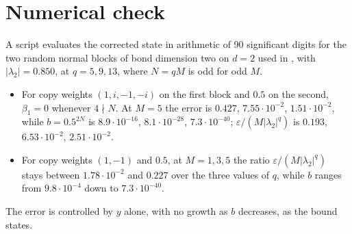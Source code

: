 \documentclass{article}
\begin{document}
\section{Numerical check}
A script evaluates the corrected state in arithmetic of 90 significant digits for the two random
normal blocks of bond dimension two on $d=2$ used in
\cite{gap:mswc24_repeated_block_corrected_state}, with $\lvert\lambda_2\rvert=0.850$, at
$q=5,9,13$, where $N=qM$ is odd for odd $M$.
\begin{itemize}
    \item For copy weights $(1,i,-1,-i)$ on the first block and $0.5$ on the second, $\beta_1=0$
          whenever $4\nmid N$. At $M=5$ the error is $0.427$, $7.55\cdot10^{-2}$,
          $1.51\cdot10^{-2}$, while $b=0.5^{2N}$ is $8.9\cdot10^{-16}$, $8.1\cdot10^{-28}$,
          $7.3\cdot10^{-40}$; $\varepsilon/(M\lvert\lambda_2\rvert^q)$ is $0.193$,
          $6.53\cdot10^{-2}$, $2.51\cdot10^{-2}$.
    \item For copy weights $(1,-1)$ and $0.5$, at $M=1,3,5$ the ratio
          $\varepsilon/(M\lvert\lambda_2\rvert^q)$ stays between $1.78\cdot10^{-2}$ and $0.227$
          over the three values of $q$, while $b$ ranges from $9.8\cdot10^{-4}$ down to
          $7.3\cdot10^{-40}$.
\end{itemize}
The error is controlled by $y$ alone, with no growth as $b$ decreases, as the bound states.



\end{document}
